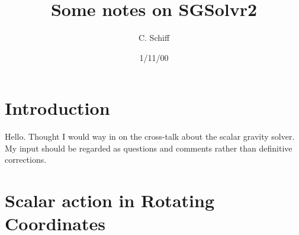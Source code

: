 %
% 
%
%
%                

%
%

\def\.{{\quad .}}
\def\_.{{\quad .}}
\def\_,{{\quad ,}}

%
%

\draft



%
%
\title{Some notes on SGSolvr2}
%
\author{C. Schiff}
\address{
            Department of Physics, University of Maryland,
            College Park MD 20742-4111 USA\\
           \rm
         e-mail: \tt  cmschiff@erols.com\\
					  Revision 0.0
}
\date{1/11/00}
\maketitle


%
%
\begin{abstract}
\end{abstract}

\section{Introduction}

Hello.  
Thought I would way in on the cross-talk about the scalar gravity solver.
My input should be regarded as questions and comments rather than 
definitive corrections.

\section{Scalar action in Rotating Coordinates}

